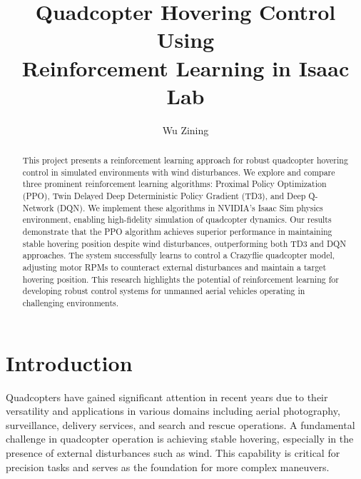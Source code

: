\documentclass[12pt]{article}
\title{Quadcopter Hovering Control Using\\Reinforcement Learning in Isaac Lab}
\author{Wu Zining}
\date{}
\begin{document}
\maketitle

\begin{abstract}
This project presents a reinforcement learning approach for robust quadcopter hovering control in simulated environments with wind disturbances. We explore and compare three prominent reinforcement learning algorithms: Proximal Policy Optimization (PPO), Twin Delayed Deep Deterministic Policy Gradient (TD3), and Deep Q-Network (DQN). We implement these algorithms in NVIDIA's Isaac Sim physics environment, enabling high-fidelity simulation of quadcopter dynamics. Our results demonstrate that the PPO algorithm achieves superior performance in maintaining stable hovering position despite wind disturbances, outperforming both TD3 and DQN approaches. The system successfully learns to control a Crazyflie quadcopter model, adjusting motor RPMs to counteract external disturbances and maintain a target hovering position. This research highlights the potential of reinforcement learning for developing robust control systems for unmanned aerial vehicles operating in challenging environments.
\end{abstract}


\section{Introduction}
Quadcopters have gained significant attention in recent years due to their versatility and applications in various domains including aerial photography, surveillance, delivery services, and search and rescue operations. A fundamental challenge in quadcopter operation is achieving stable hovering, especially in the presence of external disturbances such as wind. This capability is critical for precision tasks and serves as the foundation for more complex maneuvers.
\end{document}

